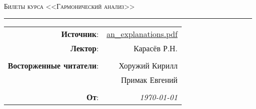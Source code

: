 
\begin{center}
    \LARGE \textsc{Билеты курса <<Гармонический анализ>>}
\end{center}

\hrule

\phantom{42}

\begin{flushright}
    \begin{tabular}{rr}
        \textbf{Источник}: 
        & \href{http://rkarasev.ru/common/upload/an_explanations.pdf}{an\_explanations.pdf} \\
        \textbf{Лектор}: 
        & Карасёв Р.Н. \\
        &\\
        \textbf{Восторженные читатели}: 
        & Хоружий Кирилл \\
        & Примак Евгений \\
        &\\
        \textbf{От}: &
        \textit{\today}\\
    \end{tabular}
\end{flushright}

\thispagestyle{empty}
\tableofcontents
\newpage
